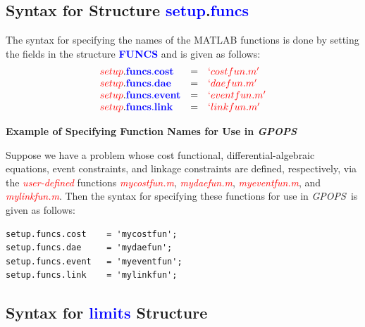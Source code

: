 \documentclass[10pt]{article}
\newcommand{\gpops}{{\em GPOPS}~}
\newenvironment{shadedframe}{%
  \def\FrameCommand{\fcolorbox{black}{shadecolor}}%
  \MakeFramed {\FrameRestore}}
{\endMakeFramed}
\newcommand{\bfblue}[1]{\textcolor{blue}{\bf #1}}
\newcommand{\slred}[1]{\textcolor{red}{\sl #1}}
\begin{document}
\subsection{Syntax for Structure \bfblue{setup}.\bfblue{funcs} \label{sect:funcNames}}

The syntax for specifying the names of the MATLAB functions is done by
setting the fields in the structure \bfblue{FUNCS} and is given as follows:
\begin{displaymath}
  \begin{array}{lcl}
    \slred{setup}.\bfblue{funcs.cost} & = & \slred{`costfun.m'} \\
    \slred{setup}.\bfblue{funcs.dae} & = & \slred{`daefun.m'} \\
    \slred{setup}.\bfblue{funcs.event} & = & \slred{`eventfun.m'} \\
    \slred{setup}.\bfblue{funcs.link} & = & \slred{`linkfun.m'}
  \end{array}
\end{displaymath}

{\noindent}{\bf Example of Specifying Function Names for Use in \gpops}

\vspace{12pt}

{\noindent}Suppose we have a problem whose cost functional,
differential-algebraic equations, event constraints, and linkage
constraints are defined, respectively, via the \slred{user-defined}
functions \slred{mycostfun.m}, \slred{mydaefun.m},
\slred{myeventfun.m}, and \slred{mylinkfun.m}.  Then the syntax for
specifying these functions for use in \gpops is given as follows:
\begin{shadedframe}
\begin{verbatim}
setup.funcs.cost    = 'mycostfun';
setup.funcs.dae     = 'mydaefun';
setup.funcs.event   = 'myeventfun';
setup.funcs.link    = 'mylinkfun';
\end{verbatim}
\end{shadedframe}

\subsection{Syntax for \bfblue{limits} Structure \label{sect:limits}}
\end{document}
